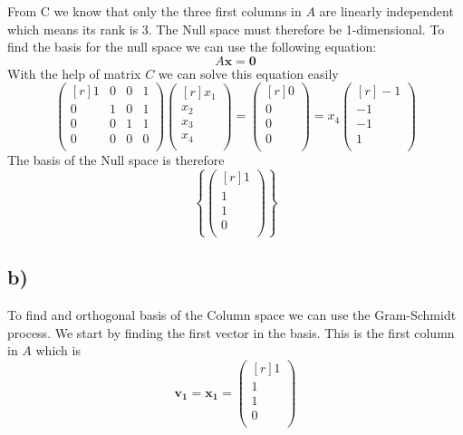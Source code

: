 \documentclass{article}
\begin{document}
From C we know that only the three first columns in $A$ are linearly independent which means its rank is 3. The Null space must therefore be 1-dimensional. To find the basis for the null space we can use the following equation:
\[
A \mathbf{x} = \mathbf 0
\]
With the help of matrix $C$ we can solve this equation easily
\[
\begin{pmatrix*}[r]
 1 & 0 & 0 & 1 \\
 0 & 1 & 0 & 1 \\
 0 & 0 & 1 & 1 \\
 0 & 0 & 0 & 0 \\
\end{pmatrix*}
\begin{pmatrix*}[r]
 x_1 \\
 x_2 \\
 x_3 \\
 x_4 \\
\end{pmatrix*} = 
\begin{pmatrix*}[r]
 0 \\
 0 \\
 0 \\
 0 \\
\end{pmatrix*} = 
x_4 
\begin{pmatrix*}[r]
 -1 \\
 -1 \\
 -1 \\
 1 \\
\end{pmatrix*}
\]
The basis of the Null space is therefore 
\[
\left\{ 
    \begin{pmatrix*}[r]
    1 \\
    1 \\
    1 \\
    0 \\
    \end{pmatrix*} 
\right\} 
\]

\subsection*{b)}
To find and orthogonal basis of the Column space we can use the Gram-Schmidt process. We start by finding the first vector in the basis. This is the first column in $A$ which is
\[
\mathbf{v_1} = \mathbf{x_1} = 
\begin{pmatrix*}[r]
    1 \\
    1 \\
    1 \\
    0 \\
\end{pmatrix*}
\]
\end{document}
